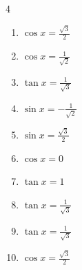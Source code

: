 \begin{multicols}{4}
\begin{enumerate}

  \item $\displaystyle \cos{x}  = \frac{\sqrt{3}}{2}$


  \item $\displaystyle \cos{x}  = \frac{1}{\sqrt{2}}$


  \item $\displaystyle \tan{x}  = \frac{1}{\sqrt{3}}$


  \item $\displaystyle \sin{x}  = -\frac{1}{\sqrt{2}}$


  \item $\displaystyle \sin{x}  = \frac{\sqrt{3}}{2}$


  \item $\displaystyle \cos{x}  = 0$


\columnbreak %

\resetques

  \item $\displaystyle \tan{x}  = 1$


  \item $\displaystyle \tan{x}  = \frac{1}{\sqrt{3}}$


  \item $\displaystyle \tan{x}  = \frac{1}{\sqrt{3}}$


  \item $\displaystyle \cos{x}  = \frac{\sqrt{3}}{2}$



\end{enumerate}
\end{multicols}
